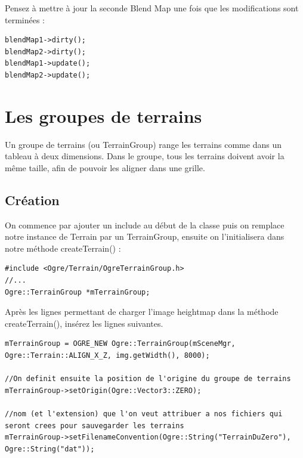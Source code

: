 \documentclass[10pt,a4paper]{report}
\begin{document}
Pensez \`a mettre \`a jour la seconde Blend Map une fois que les modifications sont termin\'ees :

\begin{lstlisting}[caption={}]
blendMap1->dirty();
blendMap2->dirty();
blendMap1->update();
blendMap2->update();
\end{lstlisting}








\section{Les groupes de terrains}

Un groupe de terrains (ou TerrainGroup) range les terrains comme dans un tableau \`a deux dimensions. Dans le groupe, tous les terrains doivent avoir la m\^eme taille, afin de pouvoir les aligner dans une grille.



\subsection{Cr\'eation}

On commence par ajouter un include au d\'ebut de la classe puis on remplace notre instance de Terrain par un TerrainGroup, ensuite on l'initialisera dans notre m\'ethode createTerrain() :

\begin{lstlisting}[caption={TerrainGroup: include et cr\'eation}]
#include <Ogre/Terrain/OgreTerrainGroup.h>
//...
Ogre::TerrainGroup *mTerrainGroup;
\end{lstlisting}

Apr\`es les lignes permettant de charger l'image heightmap dans la m\'ethode createTerrain(), ins\'erez les lignes suivantes.

\begin{lstlisting}[caption={}]
mTerrainGroup = OGRE_NEW Ogre::TerrainGroup(mSceneMgr, Ogre::Terrain::ALIGN_X_Z, img.getWidth(), 8000);

//On definit ensuite la position de l'origine du groupe de terrains
mTerrainGroup->setOrigin(Ogre::Vector3::ZERO);

//nom (et l'extension) que l'on veut attribuer a nos fichiers qui seront crees pour sauvegarder les terrains
mTerrainGroup->setFilenameConvention(Ogre::String("TerrainDuZero"), Ogre::String("dat"));
\end{lstlisting}
\end{document}
